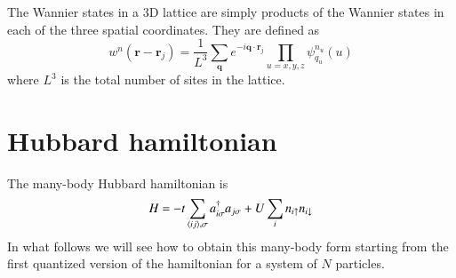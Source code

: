 \documentclass[oneside,11pt]{memoir}
\newcommand{\bv}[1]{\ensuremath{\bm{#1}}}
\newcommand{\spup}{\ensuremath{ \uparrow }}
\newcommand{\spdn}{\ensuremath{ \downarrow}}
\begin{document}
The Wannier states in a 3D lattice are simply products of the Wannier states in
each of the three spatial coordinates.  They are defined as 
\begin{equation}
 w^{n}(\bv{r}-\bv{r}_{j}) =  \frac{1}{L^{3}} \sum_{\bv{q}} e^{-i \bv{q}\cdot\bv{r}_{j} }
     \prod_{u=x,y,z}  \psi_{q_{u}}^{n_{u}}(u) 
 \label{eq:wannier3D}
\end{equation}
where $L^{3}$ is the total number of sites in the lattice. 

\section{Hubbard hamiltonian}

The many-body Hubbard hamiltonian is 
\begin{equation}
  H =  
-t \sum_{ \langle ij \rangle, \sigma   } 
          a_{i\sigma}^{\dagger}a_{j\sigma} \\
         + U\sum_{i} n_{i\spup} n_{i\spdn}  
\end{equation}
In what follows we will see how to obtain this many-body form starting from the first quantized version of the hamiltonian for a system of $N$ particles. 
\end{document}
